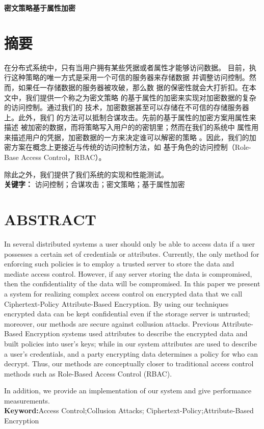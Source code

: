 \centerline{\bfseries 密文策略基于属性加密}
\chapter*{摘\qquad 要}
在分布式系统中，只有当用户拥有某些凭据或者属性才能够访问数据。
目前，执行这种策略的唯一方式是采用一个可信的服务器来存储数据
并调整访问控制。然而，如果任一存储数据的服务器被攻破，那么数
据的保密性就会大打折扣。在本文中，我们提供一个称之为密文策略
的基于属性的加密来实现对加密数据的复杂的访问控制。通过我们的
技术，加密数据甚至可以存储在不可信的存储服务器上。此外，我们
的方法可以抵制合谋攻击。先前的基于属性的加密方案用属性来描述
被加密的数据，而将策略写入用户的的密钥里；然而在我们的系统中
属性用来描述用户的凭据，加密数据的一方来决定谁可以解密的策略
。因此，我们的加密方案在概念上更接近与传统的访问控制方法，如
基于角色的访问控制（Role-Base Access Control，RBAC）。\par
除此之外，我们提供了我们系统的实现和性能测试。\\
\textbf{关键字：} 访问控制；合谋攻击；密文策略；基于属性加密
\clearpage
\chapter*{ABSTRACT}
In several distributed systems a user should only be %
able to access data if a user possesses a certain set of %
credentials or attributes. Currently, the only method %
for enforcing such policies is to employ a trusted server %
to store the data and mediate access control. However, %
if any server storing the data is compromised, then the %
confidentiality of the data will be compromised. In this %
paper we present a system for realizing complex access %
control on encrypted data that we call Ciphertext-Policy %
Attribute-Based Encryption. By using our techniques %
encrypted data can be kept confidential even if the %
storage server is untrusted; moreover, our methods are %
secure against collusion attacks. Previous Attribute-Based %
Encryption systems used attributes to describe %
the encrypted data and built policies into user’s keys;%
while in our system attributes are used to describe a %
user’s credentials, and a party encrypting data determines %
a policy for who can decrypt. Thus, our methods %
are conceptually closer to traditional access control %
methods such as Role-Based Access Control (RBAC).\par
In addition, we provide an implementation of our system %
and give performance measurements.\\
\textbf{Keyword:}Access Control;Collusion Attacks;%
Ciphertext-Policy;Attribute-Based Encryption
